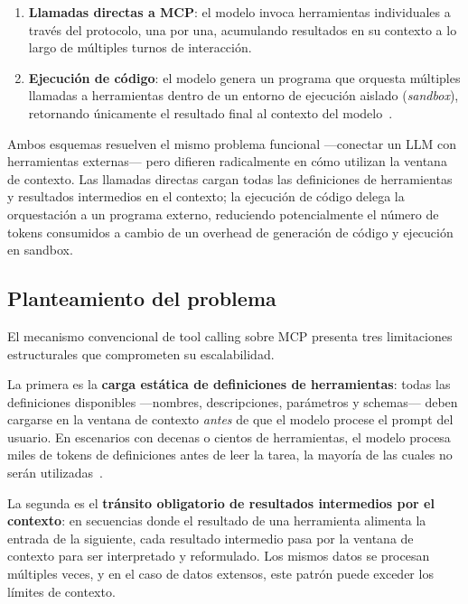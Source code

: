 \documentclass[runningheads]{llncs}
\begin{document}
\begin{enumerate}
    \item \textbf{Llamadas directas a MCP}: el modelo invoca herramientas
    individuales a trav\'es del protocolo, una por una, acumulando resultados en
    su contexto a lo largo de m\'ultiples turnos de interacci\'on.

    \item \textbf{Ejecuci\'on de c\'odigo}: el modelo genera un programa que
    orquesta m\'ultiples llamadas a herramientas dentro de un entorno de
    ejecuci\'on aislado (\textit{sandbox}), retornando \'unicamente el resultado
    final al contexto del modelo~\cite{ref_codeexec}.
\end{enumerate}

Ambos esquemas resuelven el mismo problema funcional ---conectar un LLM con
herramientas externas--- pero difieren radicalmente en c\'omo utilizan la
ventana de contexto. Las llamadas directas cargan todas las definiciones de
herramientas y resultados intermedios en el contexto; la ejecuci\'on de c\'odigo
delega la orquestaci\'on a un programa externo, reduciendo potencialmente el
n\'umero de tokens consumidos a cambio de un overhead de generaci\'on de c\'odigo
y ejecuci\'on en sandbox.

\subsection{Planteamiento del problema}
\label{sec:problem}

El mecanismo convencional de tool calling sobre MCP presenta tres limitaciones
estructurales que comprometen su escalabilidad.

La primera es la \textbf{carga est\'atica de definiciones de herramientas}: todas
las definiciones disponibles ---nombres, descripciones, par\'ametros y schemas---
deben cargarse en la ventana de contexto \textit{antes} de que el modelo procese
el prompt del usuario. En escenarios con decenas o cientos de herramientas, el
modelo procesa miles de tokens de definiciones antes de leer la tarea, la
mayor\'ia de las cuales no ser\'an utilizadas~\cite{ref_codeexec}.

La segunda es el \textbf{tr\'ansito obligatorio de resultados intermedios por el
contexto}: en secuencias donde el resultado de una herramienta alimenta la
entrada de la siguiente, cada resultado intermedio pasa por la ventana de
contexto para ser interpretado y reformulado. Los mismos datos se procesan
m\'ultiples veces, y en el caso de datos extensos, este patr\'on puede exceder
los l\'imites de contexto.
\end{document}
